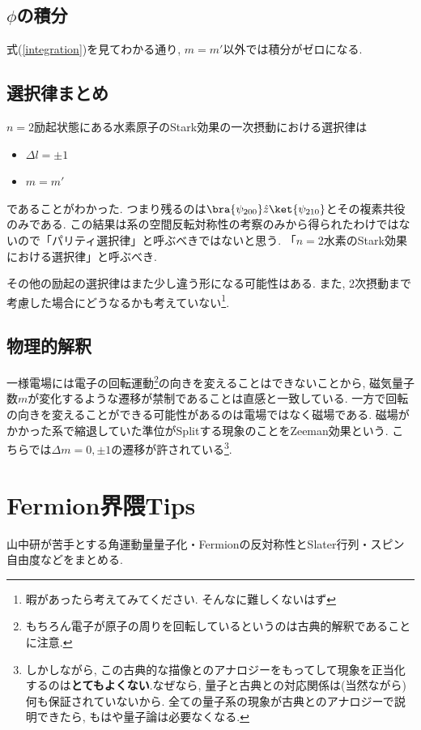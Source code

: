 \documentclass[10.5pt,a4paper]{jreport}
\begin{document}
\subsection{$\phi$の積分}
式(\ref{integration})を見てわかる通り, $m = m'$以外では積分がゼロになる.
\subsection{選択律まとめ}
$n = 2$励起状態にある水素原子のStark効果の一次摂動における選択律は
\begin{itemize}
\item $\Delta l = \pm 1$
\item $m = m'$
\end{itemize}
であることがわかった. つまり残るのは$\bra{\psi_{200}}\hat{z}\ket{\psi_{210}}$とその複素共役のみである. この結果は系の空間反転対称性の考察のみから得られたわけではないので「パリティ選択律」と呼ぶべきではないと思う. 「$n=2$水素のStark効果における選択律」と呼ぶべき.

その他の励起の選択律はまた少し違う形になる可能性はある. また, 2次摂動まで考慮した場合にどうなるかも考えていない\footnote{暇があったら考えてみてください. そんなに難しくないはず}.
\subsection{物理的解釈}
一様電場には電子の回転運動\footnote{もちろん電子が原子の周りを回転しているというのは古典的解釈であることに注意.}の向きを変えることはできないことから, 磁気量子数$m$が変化するような遷移が禁制であることは直感と一致している. 一方で回転の向きを変えることができる可能性があるのは電場ではなく磁場である. 磁場がかかった系で縮退していた準位がSplitする現象のことをZeeman効果という. こちらでは$\Delta m = 0, \pm 1$の遷移が許されている\footnote{しかしながら, この古典的な描像とのアナロジーをもってして現象を正当化するのは\textbf{とてもよくない}.なぜなら, 量子と古典との対応関係は(当然ながら)何も保証されていないから. 全ての量子系の現象が古典とのアナロジーで説明できたら, もはや量子論は必要なくなる.}.
\section{Fermion界隈Tips}
山中研が苦手とする角運動量量子化・Fermionの反対称性とSlater行列・スピン自由度などをまとめる.
\end{document}
